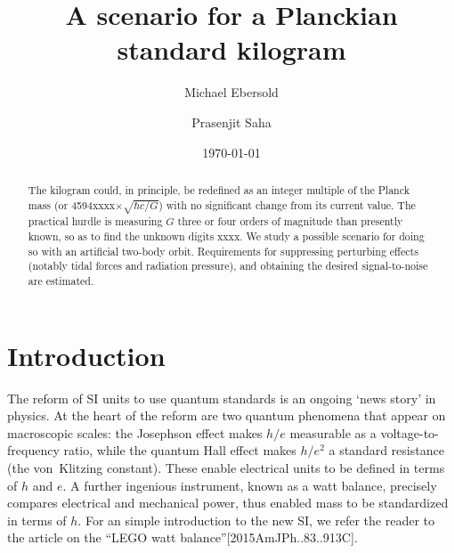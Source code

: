 \documentclass[prb,preprint]{revtex4-1}
\begin{document}

\title{A scenario for a Planckian standard kilogram}

\author{Michael Ebersold}
\author{Prasenjit Saha}


\date{\today}

\begin{abstract}
The kilogram could, in principle, be redefined as an integer multiple
of the Planck mass (or 4594xxxx$\times\sqrt{\hbar c/G}$) with no
significant change from its current value.  The practical hurdle is
measuring $G$ three or four orders of magnitude than presently known,
so as to find the unknown digits xxxx.  We study a possible scenario
for doing so with an artificial two-body orbit.  Requirements for
suppressing perturbing effects (notably tidal forces and radiation
pressure), and obtaining the desired signal-to-noise are estimated.
\end{abstract}

\maketitle

\section{Introduction}

The reform of SI units to use quantum standards is an ongoing `news
story' in physics.  At the heart of the reform are two quantum
phenomena that appear on macroscopic scales: the Josephson effect
makes $h/e$ measurable as a voltage-to-frequency ratio, while the
quantum Hall effect makes $h/e^2$ a standard resistance (the
von~Klitzing constant).  These enable electrical units to be defined
in terms of $h$ and $e$.  A further ingenious instrument, known as a
watt balance, precisely compares electrical and mechanical power, thus
enabled mass to be standardized in terms of $h$.  For an simple
introduction to the new SI, we refer the reader to the article on the
``LEGO watt balance''[2015AmJPh..83..913C]\cite{Chao15}.
\end{document}
